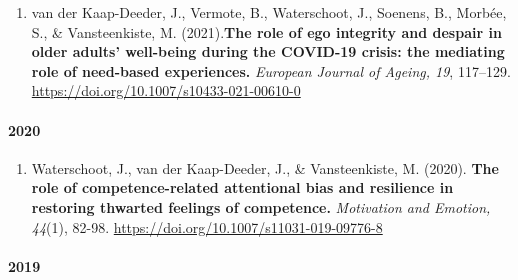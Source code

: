 \documentclass[
  twocolumn]{article}
\providecommand{\tightlist}{%
  \setlength{\itemsep}{0pt}\setlength{\parskip}{0pt}}
\begin{document}
\begin{enumerate}
\begin{enumerate}
\begin{enumerate}
\begin{enumerate}
\begin{enumerate}
          \begin{enumerate}
          \def\labelenumvi{\arabic{enumvi}.}
          \tightlist
          \item
            van der Kaap-Deeder, J., Vermote, B., Waterschoot, J.,
            Soenens, B., Morbée, S., \& Vansteenkiste, M.
            (2021).\textbf{The role of ego integrity and despair in
            older adults' well-being during the COVID-19 crisis: the
            mediating role of need-based experiences.} \emph{European
            Journal of Ageing, 19}, 117--129.
            \url{https://doi.org/10.1007/s10433-021-00610-0}
          \end{enumerate}
        \end{enumerate}
      \end{enumerate}
    \end{enumerate}
  \end{enumerate}
\end{enumerate}

\hypertarget{section-4}{%
\paragraph{2020}\label{section-4}}

\begin{enumerate}
\def\labelenumi{\arabic{enumi}.}
\setcounter{enumi}{2}
\tightlist
\item
  Waterschoot, J., van der Kaap-Deeder, J., \& Vansteenkiste, M. (2020).
  \textbf{The role of competence-related attentional bias and resilience
  in restoring thwarted feelings of competence.} \emph{Motivation and
  Emotion, 44}(1), 82-98.
  \url{https://doi.org/10.1007/s11031-019-09776-8}
\end{enumerate}

\hypertarget{section-5}{%
\paragraph{2019}\label{section-5}}
\end{document}
